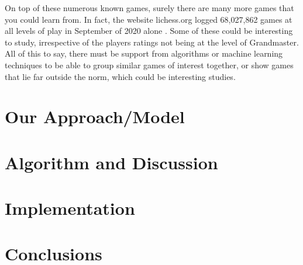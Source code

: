 \documentclass[12pt]{article}
\begin{document}
    On top of these numerous known games, surely there are many more games that you could learn from. In fact, the website lichess.org logged 68,027,862 games at all levels of play in September of 2020 alone \cite{lichessdb}. Some of these could be interesting to study, irrespective of the players ratings not being at the level of Grandmaster. All of this to say, there must be support from algorithms or machine learning techniques to be able to group similar games of interest together, or show games that lie far outside the norm, which could be interesting studies.
    
    \section{Our Approach/Model}
    
    \section{Algorithm and Discussion}
    
    \section{Implementation}
    
    \section{Conclusions}
    
    \clearpage
    \printbibliography
\end{document}
